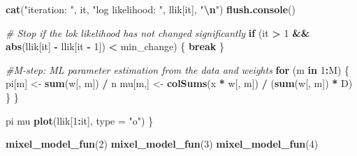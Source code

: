 \documentclass[
]{article}
\newenvironment{Shaded}{\begin{snugshade}}{\end{snugshade}}
\newcommand{\AttributeTok}[1]{\textcolor[rgb]{0.13,0.29,0.53}{#1}}
\newcommand{\CommentTok}[1]{\textcolor[rgb]{0.56,0.35,0.01}{\textit{#1}}}
\newcommand{\ControlFlowTok}[1]{\textcolor[rgb]{0.13,0.29,0.53}{\textbf{#1}}}
\newcommand{\DecValTok}[1]{\textcolor[rgb]{0.00,0.00,0.81}{#1}}
\newcommand{\FunctionTok}[1]{\textcolor[rgb]{0.13,0.29,0.53}{\textbf{#1}}}
\newcommand{\NormalTok}[1]{#1}
\newcommand{\OtherTok}[1]{\textcolor[rgb]{0.56,0.35,0.01}{#1}}
\newcommand{\SpecialCharTok}[1]{\textcolor[rgb]{0.81,0.36,0.00}{\textbf{#1}}}
\newcommand{\StringTok}[1]{\textcolor[rgb]{0.31,0.60,0.02}{#1}}
\begin{document}
\begin{Shaded}
\begin{Highlighting}[]
    \FunctionTok{cat}\NormalTok{(}\StringTok{"iteration: "}\NormalTok{, it, }\StringTok{"log likelihood: "}\NormalTok{, llik[it], }\StringTok{"}\SpecialCharTok{\textbackslash{}n}\StringTok{"}\NormalTok{)}
    \FunctionTok{flush.console}\NormalTok{()}

    \CommentTok{\# Stop if the lok likelihood has not changed significantly}
    \ControlFlowTok{if}\NormalTok{ (it }\SpecialCharTok{\textgreater{}} \DecValTok{1} \SpecialCharTok{\&\&} \FunctionTok{abs}\NormalTok{(llik[it] }\SpecialCharTok{{-}}\NormalTok{ llik[it }\SpecialCharTok{{-}} \DecValTok{1}\NormalTok{]) }\SpecialCharTok{\textless{}}\NormalTok{ min\_change) \{}
        \ControlFlowTok{break}
\NormalTok{    \}}

    \CommentTok{\#M{-}step: ML parameter estimation from the data and weights}
    \ControlFlowTok{for}\NormalTok{ (m }\ControlFlowTok{in} \DecValTok{1}\SpecialCharTok{:}\NormalTok{M) \{}
\NormalTok{        pi[m] }\OtherTok{\textless{}{-}} \FunctionTok{sum}\NormalTok{(w[, m]) }\SpecialCharTok{/}\NormalTok{ n}
\NormalTok{        mu[m,] }\OtherTok{\textless{}{-}} \FunctionTok{colSums}\NormalTok{(x }\SpecialCharTok{*}\NormalTok{ w[, m]) }\SpecialCharTok{/}\NormalTok{ (}\FunctionTok{sum}\NormalTok{(w[, m]) }\SpecialCharTok{*}\NormalTok{ D)}
\NormalTok{    \}}
\NormalTok{    \}}

\NormalTok{    pi}
\NormalTok{    mu}
    \FunctionTok{plot}\NormalTok{(llik[}\DecValTok{1}\SpecialCharTok{:}\NormalTok{it], }\AttributeTok{type =} \StringTok{"o"}\NormalTok{)}
\NormalTok{\}}

\FunctionTok{mixel\_model\_fun}\NormalTok{(}\DecValTok{2}\NormalTok{)}
\FunctionTok{mixel\_model\_fun}\NormalTok{(}\DecValTok{3}\NormalTok{)}
\FunctionTok{mixel\_model\_fun}\NormalTok{(}\DecValTok{4}\NormalTok{)}
\end{Highlighting}
\end{Shaded}
\end{document}

